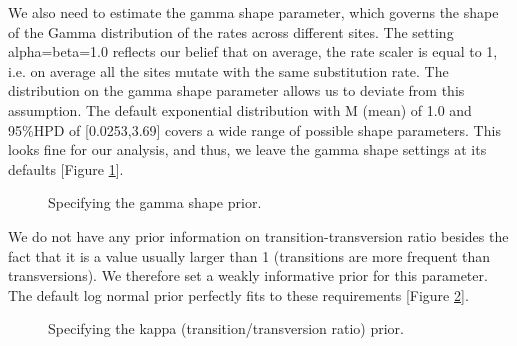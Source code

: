 \documentclass[11pt]{article}
\begin{document}
We also need to estimate the gamma shape parameter, which governs the shape of the Gamma distribution of the rates across different sites. The setting alpha=beta=1.0 reflects our belief that on average, the rate scaler is equal to 1, i.e. on average all the sites mutate with the same substitution rate. The distribution on the gamma shape parameter allows us to deviate from this assumption. The default exponential distribution with M (mean) of 1.0 and 95\%HPD of [0.0253,3.69] covers a wide range of possible shape parameters. This looks fine for our analysis, and thus, we leave the gamma shape settings at its defaults [Figure \ref{gammaShapeprior}].
 
\begin{figure}[h!]
\centering
{}
\caption{\small Specifying the gamma shape prior.}
\label{gammaShapeprior}
\end{figure}

\newpage
We do not have any prior information on transition-transversion ratio besides the fact that it is a value usually larger than 1 (transitions are more frequent than transversions). We therefore set a weakly informative prior for this parameter. The default log normal prior perfectly fits to these requirements [Figure \ref{kappaPrior}]. 

\begin{figure}[h!]
\centering
{}
\caption{\small Specifying the kappa (transition/transversion ratio) prior.}
\label{kappaPrior}
\end{figure}
\end{document}
